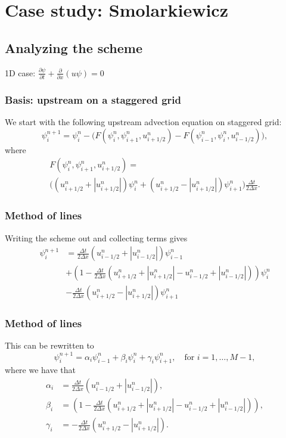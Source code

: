 \documentclass[hyperref={pdfstartview=Fit}]{beamer}
\providecommand{\abs}[1]{\left\lvert#1\right\rvert}
\begin{document}
\section{Case study: Smolarkiewicz}
\subsection{Analyzing the scheme}

\begin{frame}
1D case: $\frac{\partial \psi}{\partial t} + \frac{\partial}{\partial x}(u\psi) = 0$
\vspace{0.3cm}

\frametitle{Basis: upstream on a staggered grid}
We start with the following upstream advection equation on staggered grid:
\begin{equation*}
 \psi_i^{n+1} = \psi_i^n - \Big( F \left( \psi_i^n,\psi_{i+1}^n,u_{i+1/2}^n\right)
-F \left( \psi_{i-1}^n,\psi_{i}^n,u_{i-1/2}^n\right) \Big),
\end{equation*}
where
\begin{multline*}
F \left( \psi_i^n,\psi_{i+1}^n,u_{i+1/2}^n\right) =\\
\Big( \left( u_{i+1/2}^n + \abs{u_{i+1/2}^n} \right) \psi_i^n
+ \left( u_{i+1/2}^n - \abs{u_{i+1/2}^n} \right) \psi_{i+1}^n \Big)
\frac{\Delta t}{2 \Delta x}.
\end{multline*}
\end{frame}

\begin{frame}
\frametitle{Method of lines}
Writing the scheme out and collecting terms gives
\begin{equation*}
\begin{split}
\psi_i^{n+1} &=
\frac{\Delta t}{2 \Delta x} \left( u_{i-1/2}^n + \abs{u_{i-1/2}^n} \right) \psi_{i-1}^n\\
&+ \left(1 - \frac{\Delta t}{2 \Delta x} \left( u_{i+1/2}^n + \abs{u_{i+1/2}^n} - u_{i-1/2}^n + \abs{u_{i-1/2}^n} \right) \right) \psi_i^n\\
&-\frac{\Delta t}{2 \Delta x} \left( u_{i+1/2}^n - \abs{u_{i+1/2}^n} \right) \psi_{i+1}^n
\end{split}
\end{equation*}
\end{frame}

\begin{frame}
\frametitle{Method of lines}
This can be rewritten to 
\begin{equation*}
\psi_i^{n+1} = \alpha_i \psi_{i-1}^n + \beta_i \psi_i^n +\gamma_i \psi_{i+1}^n, \quad \text{for } i=1,\ldots,M-1,
\end{equation*}
 where we have that
\begin{align*}
\alpha_i &= \frac{\Delta t}{2 \Delta x} \left( u_{i-1/2}^n + \abs{u_{i-1/2}^n} \right),\\
 \beta_i &= \left(1 - \frac{\Delta t}{2 \Delta x} \left( u_{i+1/2}^n + \abs{u_{i+1/2}^n} - u_{i-1/2}^n + \abs{u_{i-1/2}^n} \right) \right),\\
\gamma_i &= -\frac{\Delta t}{2 \Delta x} \left( u_{i+1/2}^n - \abs{u_{i+1/2}^n} \right).
\end{align*}
\end{frame}
\end{document}
